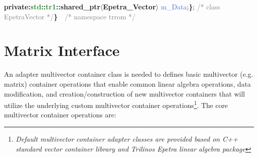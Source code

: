     \textbf{private:}\newline\tab\textbf{\textcolor{ForestGreen}{std}::\textcolor{ForestGreen}{tr1}::\textcolor{Melon}{shared\_ptr}$\langle$\textcolor{Melon}{Epetra\_Vector}$\rangle$} \textcolor{RoyalBlue}{m\_Data};\newline\textbf{\}}; \textcolor{gray}{/* class EpetraVector */}\newline\textbf{\}}\ \ \textcolor{gray}{/* namespace trrom */}
    
    \section{Matrix Interface}\label{sec:MultiVecAPI}
    
    An adapter multivector container class is needed to defines basic multivector (e.g. matrix) container operations that enable common linear algebra operations, data modification, and creation/construction of new multivector containers that will utilize the underlying custom multivector container operations\footnote{\emph{Default multivector container adapter classes are provided based on C++ standard vector container library and Trilinos Epetra linear algebra package}}. The core multivector container operations are:
    
